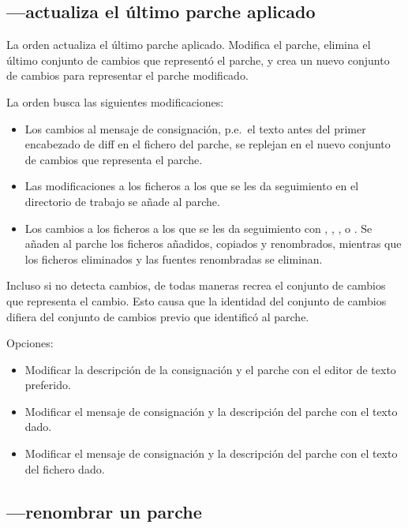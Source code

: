 \subsection{---actualiza el último parche aplicado}

La orden  actualiza el último parche aplicado.
Modifica el parche, elimina el último conjunto de cambios que
representó el parche, y crea un nuevo conjunto de cambios para
representar el parche modificado.

La orden  busca las siguientes modificaciones:
\begin{itemize}
\item Los cambios al mensaje de consignación, p.e.~el texto antes del
  primer encabezado de diff en el fichero del parche, se replejan en
  el nuevo conjunto de cambios que representa el parche.
\item Las modificaciones a los ficheros a los que se les da
  seguimiento en el directorio de trabajo se añade al parche.
\item Los cambios a los ficheros a los que se les da seguimiento con
  , , , o .  Se
  añaden al parche los ficheros añadidos, copiados y renombrados,
  mientras que los ficheros eliminados y las fuentes renombradas se
  eliminan.
\end{itemize}

Incluso si  no detecta cambios, de todas maneras
recrea el conjunto de cambios que representa el cambio.  Esto causa
que la identidad del conjunto de cambios difiera del conjunto de
cambios previo que identificó al parche.

Opciones:
\begin{itemize}
\item[\hgxopt{mq}{qrefresh}{-e}] Modificar la descripción de la
  consignación y el parche con el editor de texto preferido.
\item[\hgxopt{mq}{qrefresh}{-m}] Modificar el mensaje de consignación
  y la descripción del parche con el texto dado.
\item[\hgxopt{mq}{qrefresh}{-l}] Modificar el mensaje de consignación
  y la descripción del parche con el texto del fichero dado.
\end{itemize}

\subsection{---renombrar un parche}

